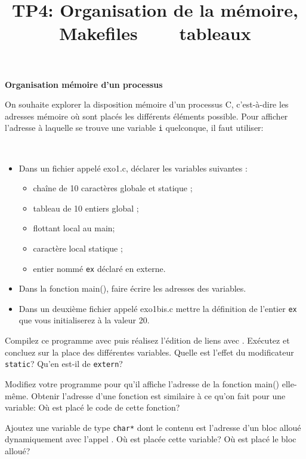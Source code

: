 \documentclass[10pt]{article}\usepackage[nu]{esial}
\begin{document}
\title{TP4: Organisation de la mémoire, Makefiles ~~~  tableaux}
\maketitle

\begin{Exercice}\textbf{Organisation mémoire d'un processus}

On souhaite explorer la disposition mémoire d'un processus C, c'est-à-dire les
adresses mémoire où sont placés les différents éléments possible. Pour afficher
l'adresse à laquelle se trouve une variable \texttt{i} quelconque, il faut
utiliser: 

\Question~\\[-\baselineskip]
\begin{itemize}
\item Dans un fichier appelé exo1.c, déclarer les variables suivantes :
  \begin{itemize}
  \item chaîne de 10 caractères globale et statique ;
  \item tableau de 10 entiers global ;
  \item flottant local au main;
  \item caractère local statique ;
  \item entier nommé \texttt{ex} déclaré en externe.
  \end{itemize}
\item Dans la fonction main(), faire écrire les adresses des variables.
\item Dans un deuxième fichier appelé exo1bis.c mettre la définition de
  l'entier \texttt{ex} que vous initialiserez à la valeur 20.
\end{itemize}

\Question Compilez ce programme avec  
puis réalisez l'édition de liens avec .
Exécutez  et concluez sur la place des différentes variables. Quelle
est l'effet du modificateur \texttt{static}? Qu'en est-il de \texttt{extern}?

\Question Modifiez votre programme pour qu'il affiche l'adresse de la fonction
main() elle-même. Obtenir l'adresse d'une fonction est similaire à ce qu'on
fait pour une variable:  Où est
placé le code de cette fonction?

\Question Ajoutez une variable de type \texttt{char*} dont le contenu est
l'adresse d'un bloc alloué dynamiquement avec l'appel . Où
est placée cette variable? Où est placé le bloc alloué?
\end{Exercice}
\end{document}
